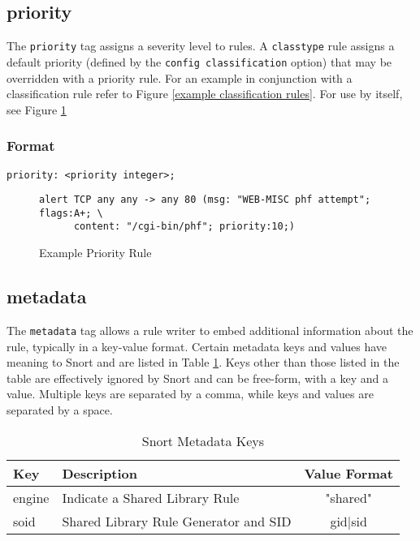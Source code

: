 \documentclass[english]{report}
\begin{document}
\subsection{priority}

The \texttt{priority} tag assigns a severity level to rules. A \texttt{classtype} rule
assigns a default priority (defined by the \texttt{config classification} option) 
that may be overridden with a priority
rule. For an example in conjunction with a classification rule refer
to Figure \ref{example classification rules}. For use by itself,
see Figure \ref{example priority rule}


\subsubsection{Format}

\begin{verbatim}
priority: <priority integer>;
\end{verbatim}

\begin{figure}[!hbpt]
\begin{verbatim}
alert TCP any any -> any 80 (msg: "WEB-MISC phf attempt"; flags:A+; \
      content: "/cgi-bin/phf"; priority:10;)
\end{verbatim}

\caption{Example Priority Rule\label{example priority rule}}
\end{figure}

\subsection{metadata}
The \texttt{metadata} tag allows a rule writer to embed additional information about the rule, typically in a key-value format.  Certain metadata keys and values have meaning to Snort and are listed in Table \ref{Snort Metadata Keys}.  Keys other than those listed in the table are effectively ignored by Snort and can be free-form, with a key and a value.  Multiple keys are separated by a comma, while keys and values are separated by a space.

\begin{center}
\begin{longtable}{|p{1in}|p{2.5in}|c|}
\caption{Snort Metadata Keys \label{Snort Metadata Keys}} \\
\hline 
Key & Description & Value Format \\
\hline
\hline
engine &
Indicate a Shared Library Rule & "shared" \\
\hline 
soid &
Shared Library Rule Generator and SID & gid$|$sid \\
\hline 
\end{longtable}
\end{center}
\end{document}
